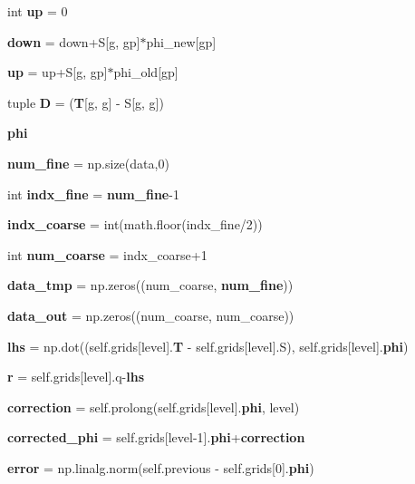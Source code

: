 \begin{DoxyCompactItemize}
\item 
int {\bfseries up} = 0\label{classmultilevel__solver_1_1_grid_set_ad4617f2f8b0cbfe4f5af010fb18349f3}

\item 
{\bfseries down} = down+S[g, gp]$\ast$phi\+\_\+new[gp]\label{classmultilevel__solver_1_1_grid_set_ae1d95791d2c5e09e2b7f0f49698d695e}

\item 
{\bfseries up} = up+S[g, gp]$\ast$phi\+\_\+old[gp]\label{classmultilevel__solver_1_1_grid_set_a24c95a1ccdcf7527c1c9fc6af4eba572}

\item 
tuple {\bfseries D} = ({\bf T}[g, g] -\/ S[g, g])\label{classmultilevel__solver_1_1_grid_set_a343466da52e736f54da84240f7aa1d00}

\item 
{\bf phi}
\item 
{\bf num\+\_\+fine} = np.\+size(data,0)
\item 
int {\bfseries indx\+\_\+fine} = {\bf num\+\_\+fine}-\/1\label{classmultilevel__solver_1_1_grid_set_a0d14400f3187938c13fc4dc7e69bdc11}

\item 
{\bfseries indx\+\_\+coarse} = int(math.\+floor(indx\+\_\+fine/2))\label{classmultilevel__solver_1_1_grid_set_ac9130429945c3c362ed5f6b3486fd2d1}

\item 
int {\bfseries num\+\_\+coarse} = indx\+\_\+coarse+1\label{classmultilevel__solver_1_1_grid_set_a85786972d0474377aa1ec653457089b8}

\item 
{\bfseries data\+\_\+tmp} = np.\+zeros((num\+\_\+coarse, {\bf num\+\_\+fine}))\label{classmultilevel__solver_1_1_grid_set_ab8efbb954bd7e454df96d96ea4a62cb9}

\item 
{\bfseries data\+\_\+out} = np.\+zeros((num\+\_\+coarse, num\+\_\+coarse))\label{classmultilevel__solver_1_1_grid_set_a5cf175528e47b612c09baece04e354a4}

\item 
{\bf lhs} = np.\+dot((self.\+grids[level].{\bf T} -\/ self.\+grids[level].S), self.\+grids[level].{\bf phi})
\item 
{\bfseries r} = self.\+grids[level].q-\/{\bf lhs}\label{classmultilevel__solver_1_1_grid_set_ae0623319fb298cfa66f715bf4fd72f58}

\item 
{\bf correction} = self.\+prolong(self.\+grids[level].{\bf phi}, level)
\item 
{\bfseries corrected\+\_\+phi} = self.\+grids[level-\/1].{\bf phi}+{\bf correction}\label{classmultilevel__solver_1_1_grid_set_ae3a2829850e71626fa08b32f534eff1f}

\item 
{\bf error} = np.\+linalg.\+norm(self.\+previous -\/ self.\+grids[0].{\bf phi})
\end{DoxyCompactItemize}


